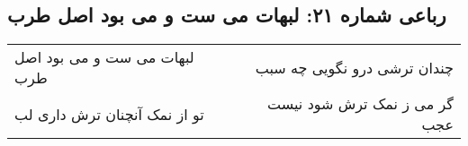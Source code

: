 \begin{center}
\section*{رباعی شماره ۲۱: لبهات می ست و می بود اصل طرب}
\label{sec:sh021}
\begin{longtable}{l p{0.5cm} r}
لبهات می ست و می بود اصل طرب
&&
چندان ترشی درو نگویی چه سبب
\\
تو از نمک آنچنان ترش داری لب
&&
گر می ز نمک ترش شود نیست عجب
\\
\end{longtable}
\end{center}
